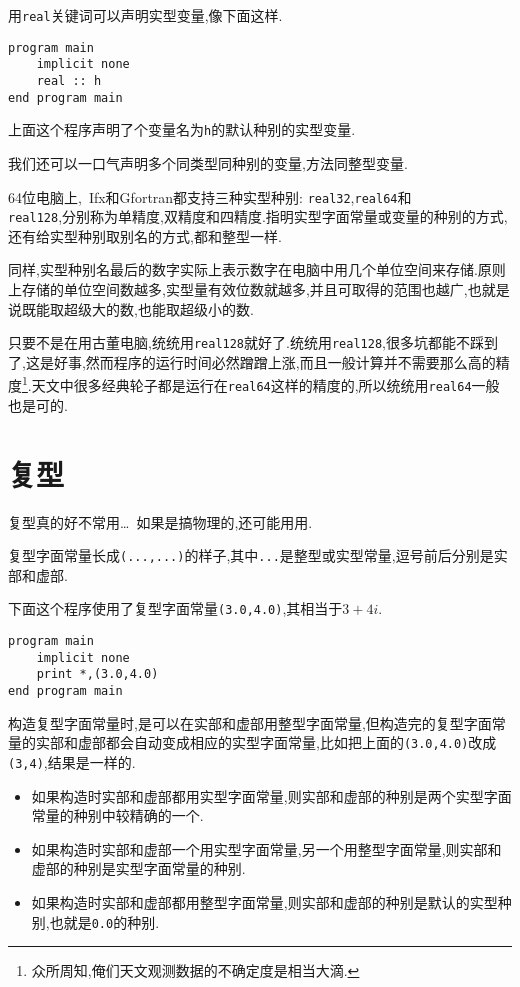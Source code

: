 用\texttt{real}关键词可以声明实型变量,像下面这样.
\begin{lstlisting}
program main
    implicit none
    real :: h
end program main
\end{lstlisting}

上面这个程序声明了个变量名为\texttt{h}的默认种别的实型变量.

我们还可以一口气声明多个同类型同种别的变量,方法同整型变量.

64位电脑上,~Ifx和Gfortran都支持三种实型种别: \texttt{real32},\texttt{real64}和\\\texttt{real128},分别称为单精度,双精度和四精度.指明实型字面常量或变量的种别的方式,还有给实型种别取别名的方式,都和整型一样.

同样,实型种别名最后的数字实际上表示数字在电脑中用几个单位空间来存储.原则上存储的单位空间数越多,实型量有效位数就越多,并且可取得的范围也越广,也就是说既能取超级大的数,也能取超级小的数.

只要不是在用古董电脑,统统用\texttt{real128}就好了.统统用\texttt{real128},很多坑都能不踩到了,这是好事,然而程序的运行时间必然蹭蹭上涨,而且一般计算并不需要那么高的精度\footnote{众所周知,俺们天文观测数据的不确定度是相当大滴.}.天文中很多经典轮子都是运行在\texttt{real64}这样的精度的,所以统统用\texttt{real64}一般也是可的.

\section{复型}

复型真的好不常用\dots{}~如果是搞物理的,还可能用用.

复型字面常量长成\texttt{(...,...)}的样子,其中\texttt{...}是整型或实型常量,逗号前后分别是实部和虚部.

下面这个程序使用了复型字面常量\texttt{(3.0,4.0)},其相当于$3+4i$.
\begin{lstlisting}
program main
    implicit none
    print *,(3.0,4.0)
end program main
\end{lstlisting}

构造复型字面常量时,是可以在实部和虚部用整型字面常量,但构造完的复型字面常量的实部和虚部都会自动变成相应的实型字面常量,比如把上面的\texttt{(3.0,4.0)}改成\texttt{(3,4)},结果是一样的.
\begin{itemize}
    \item 如果构造时实部和虚部都用实型字面常量,则实部和虚部的种别是两个实型字面常量的种别中较精确的一个.
    \item 如果构造时实部和虚部一个用实型字面常量,另一个用整型字面常量,则实部和虚部的种别是实型字面常量的种别.
    \item 如果构造时实部和虚部都用整型字面常量,则实部和虚部的种别是默认的实型种别,也就是\texttt{0.0}的种别.
\end{itemize}

